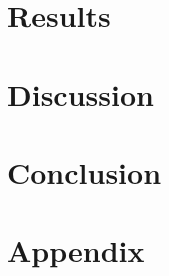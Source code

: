 \documentclass[12pt]{article}
\begin{document}
\section{Results}


\section{Discussion}


\section{Conclusion}



\nocite{*}
{\small


}

\newpage


\FloatBarrier %
\singlespacing


\newpage
\appendix
\setcounter{figure}{0}
\setcounter{table}{0}
\renewcommand{\thefigure}{A\arabic{figure}}
\renewcommand{\thetable}{A\arabic{table}}
\section{Appendix}



\nocite{*}



%
\end{document}
